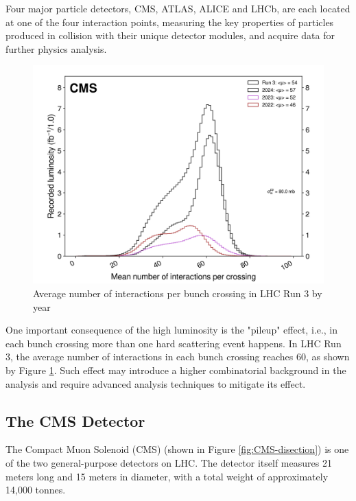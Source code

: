 \documentclass[10pt,twocolumn]{article}
\begin{document}
Four major particle detectors, CMS, ATLAS, ALICE and LHCb, are each located at one of the four interaction points, measuring the key properties of particles produced in collision with their unique detector modules, and acquire data for further physics analysis.

\begin{figure}[!htbp]
    \centering
    \includegraphics[width=1.0\linewidth]{images/CMS_pileup_allYears_run3.png}
    \caption{Average number of interactions per bunch crossing in LHC Run 3 by year\cite{CMS:LUMI-PUB}}
    \label{fig:CMS_pileup}
\end{figure}

One important consequence of the high luminosity is the "pileup" effect, i.e., in each bunch crossing more than one hard scattering event happens. In LHC Run 3, the average number of interactions in each bunch crossing reaches 60, as shown by Figure \ref{fig:CMS_pileup}. \cite{CMS:LUMI-PUB} Such effect may introduce a higher combinatorial background in the analysis and require advanced analysis techniques to mitigate its effect.

\subsection{The CMS Detector}

The Compact Muon Solenoid (CMS) (shown in Figure \ref{fig:CMS-disection}) is one of the two general-purpose detectors on LHC. The detector itself measures 21 meters long and 15 meters in diameter, with a total weight of approximately 14,000 tonnes.
\end{document}
